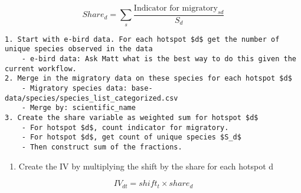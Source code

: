\documentclass[
  letterpaper,
]{article}
\providecommand{\tightlist}{%
  \setlength{\itemsep}{0pt}\setlength{\parskip}{0pt}}\usepackage{longtable,booktabs,array}
\begin{document}
\begin{tcolorbox}
\[
Share_d =  \sum_s \frac{\text{Indicator for migratory}_{sd}}{S_d}
\]

\begin{verbatim}
1. Start with e-bird data. For each hotspot $d$ get the number of unique species observed in the data
    - e-bird data: Ask Matt what is the best way to do this given the current workflow. 
2. Merge in the migratory data on these species for each hotspot $d$
    - Migratory species data: base-data/species/species_list_categorized.csv
    - Merge by: scientific_name
3. Create the share variable as weighted sum for hotspot $d$
    - For hotspot $d$, count indicator for migratory. 
    - For hotspot $d$, get count of unique species $S_d$
    - Then construct sum of the fractions. 
\end{verbatim}

\begin{enumerate}
\def\labelenumi{\arabic{enumi}.}
\setcounter{enumi}{4}
\tightlist
\item
  Create the IV by multiplying the shift by the share for each hotspot d
\end{enumerate}

\[
IV_{dt} = shift_t \times share_d
\]

\end{tcolorbox}
\end{document}
